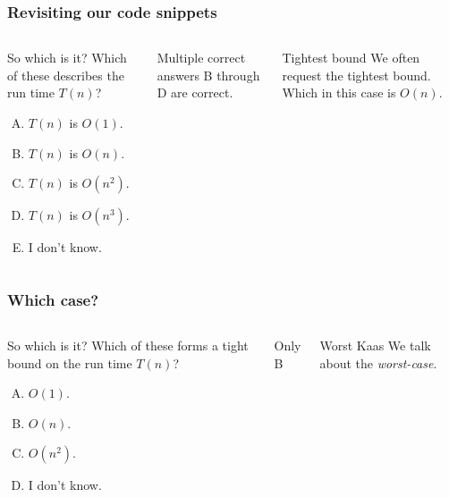 \begin{frame}
	\frametitle{Revisiting our code snippets}
	
	
	\begin{columns}
	\begin{questionblock}{So which is it?}
		Which of these describes the run time $T(n)$?
	\begin{enumerate}[A.]
		\item $T(n)$ is $O(1)$.
		\item $T(n)$ is $O(n)$. 
		\item $T(n)$ is $O(n^2)$. 
		\item $T(n)$ is $O(n^3)$. 
		\item I don't know.
	\end{enumerate}	
	\end{questionblock}
		\pause
		\begin{answerblock}{Multiple correct answers}
			B through D are correct.
		\end{answerblock}
		\pause
			\begin{block}{Tightest bound}
				We often request the tightest bound. Which in this case is $O(n)$.
			\end{block}	
	\end{columns}
\end{frame}

\begin{frame}
	\frametitle{Which case?}
	
	\begin{columns}
		\column{0.755\textwidth}
	\begin{questionblock}{So which is it?}
		Which of these forms a tight bound on the run time $T(n)$?
	\begin{enumerate}[A.]
		\small
		\item $O(1)$. 
		\item $O(n)$. 
		\item $O(n^2)$. 
		\item I don't know.
	\end{enumerate}	
	\end{questionblock}
		\column{0.255\textwidth}
		\pause
		\begin{answerblock}{}
			Only B
		\end{answerblock}
		\pause
			\begin{block}{Worst Kaas}
				We talk about the \textit{worst-case}.
			\end{block}	
	\end{columns}
\end{frame}

